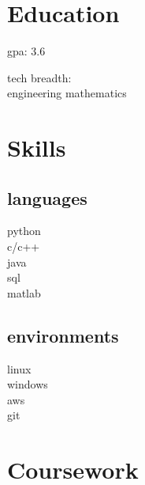 
\begin{minipage}[t]{0.33\textwidth} %


\section{Education} 
\vspace{\topsep} %
\vspace{1pt}
\begin{tightitemize}
\item gpa: 3.6
\item tech breadth:\\engineering mathematics
\end{tightitemize}
\vspace{6pt}

\section{Skills}
\subsection{languages}
\normalsize
python \\
c/c++ \\
java \\
sql \\
matlab \\ 
\sectionspace

\subsection{environments}
linux \\
windows \\
aws \\
git \\

\sectionspace %

\section{Coursework}



\end{minipage}
